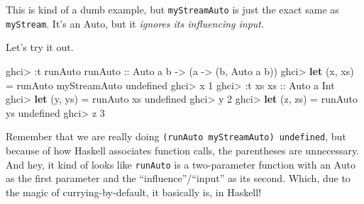 \documentclass[]{article}
\newenvironment{Shaded}{}{}
\newcommand{\KeywordTok}[1]{\textcolor[rgb]{0.00,0.44,0.13}{\textbf{{#1}}}}
\newcommand{\DataTypeTok}[1]{\textcolor[rgb]{0.56,0.13,0.00}{{#1}}}
\newcommand{\DecValTok}[1]{\textcolor[rgb]{0.25,0.63,0.44}{{#1}}}
\newcommand{\CommentTok}[1]{\textcolor[rgb]{0.38,0.63,0.69}{\textit{{#1}}}}
\newcommand{\OtherTok}[1]{\textcolor[rgb]{0.00,0.44,0.13}{{#1}}}
\newcommand{\FunctionTok}[1]{\textcolor[rgb]{0.02,0.16,0.49}{{#1}}}
\newcommand{\NormalTok}[1]{{#1}}
\begin{document}
\begin{Shaded}
\end{Shaded}

This is kind of a dumb example, but \texttt{myStreamAuto} is just the exact same
as \texttt{myStream}. It's an Auto, but it \emph{ignores its influencing input}.

Let's try it out.

\begin{Shaded}
\begin{Highlighting}[]
\NormalTok{ghci}\FunctionTok{>} \FunctionTok{:}\NormalTok{t runAuto}
\OtherTok{runAuto ::} \DataTypeTok{Auto} \NormalTok{a b }\OtherTok{->} \NormalTok{(a }\OtherTok{->} \NormalTok{(b, }\DataTypeTok{Auto} \NormalTok{a b))}
\NormalTok{ghci}\FunctionTok{>} \KeywordTok{let} \NormalTok{(x, xs) }\FunctionTok{=} \NormalTok{runAuto myStreamAuto undefined}
\NormalTok{ghci}\FunctionTok{>} \NormalTok{x}
\DecValTok{1}
\NormalTok{ghci}\FunctionTok{>} \FunctionTok{:}\NormalTok{t xs}
\OtherTok{xs ::} \DataTypeTok{Auto} \NormalTok{a }\DataTypeTok{Int}
\NormalTok{ghci}\FunctionTok{>} \KeywordTok{let} \NormalTok{(y, ys) }\FunctionTok{=} \NormalTok{runAuto xs undefined}
\NormalTok{ghci}\FunctionTok{>} \NormalTok{y}
\DecValTok{2}
\NormalTok{ghci}\FunctionTok{>} \KeywordTok{let} \NormalTok{(z, zs) }\FunctionTok{=} \NormalTok{runAuto ys undefined}
\NormalTok{ghci}\FunctionTok{>} \NormalTok{z}
\DecValTok{3}
\end{Highlighting}
\end{Shaded}

Remember that we are really doing \texttt{(runAuto\ myStreamAuto)\ undefined},
but because of how Haskell associates function calls, the parentheses are
unnecessary. And hey, it kind of looks like \texttt{runAuto} is a two-parameter
function with an Auto as the first parameter and the ``influence''/``input'' as
its second. Which, due to the magic of currying-by-default, it basically is, in
Haskell!
\end{document}
